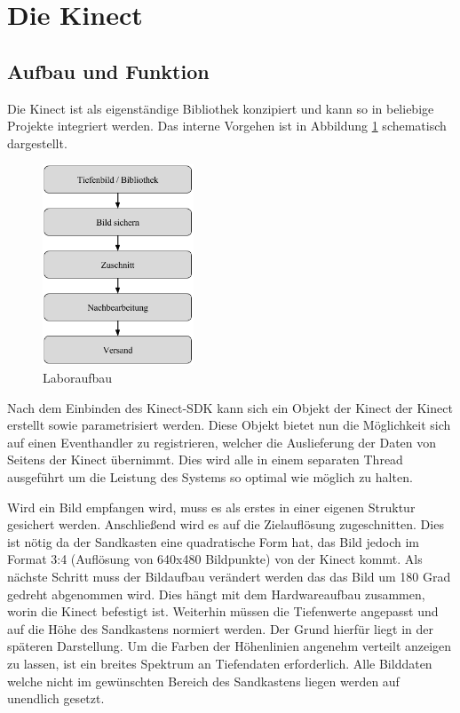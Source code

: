 \section{Die Kinect}
\begin{Spacing}{\mylinespace}

\subsection{Aufbau und Funktion}

Die Kinect ist als eigenständige Bibliothek konzipiert und kann so in beliebige Projekte integriert werden. Das interne Vorgehen ist in Abbildung \ref{fig:kinectdll} schematisch dargestellt. 

\begin{figure}[hbtp]
	\vspace{15px}
	\centering
	\includegraphics[width=0.4\textwidth]{graphics/block_dll.png}
	\caption{Laboraufbau}
	\label{fig:kinectdll}
\end{figure}

Nach dem Einbinden des Kinect-SDK kann sich ein Objekt der Kinect der Kinect erstellt sowie parametrisiert werden. Diese Objekt bietet nun die Möglichkeit sich auf einen Eventhandler zu registrieren, welcher die Auslieferung der Daten von Seitens der Kinect übernimmt. Dies wird alle in einem separaten Thread ausgeführt um die Leistung des Systems so optimal wie möglich zu halten.

Wird ein Bild empfangen wird, muss es als erstes in einer eigenen Struktur gesichert werden. Anschließend wird es auf die Zielauflösung zugeschnitten.
Dies ist nötig da der Sandkasten eine quadratische Form hat, das Bild jedoch im Format 3:4 (Auflösung von 640x480 Bildpunkte) von der Kinect kommt.
Als nächste Schritt muss der Bildaufbau verändert werden das das Bild um 180 Grad gedreht abgenommen wird. Dies hängt mit dem Hardwareaufbau zusammen, worin die Kinect befestigt ist. Weiterhin müssen die Tiefenwerte angepasst und auf die Höhe des Sandkastens normiert werden. Der Grund hierfür liegt in der späteren Darstellung. Um die Farben der Höhenlinien angenehm verteilt anzeigen zu lassen, ist ein breites Spektrum an Tiefendaten erforderlich. Alle Bilddaten welche nicht im gewünschten Bereich des Sandkastens liegen werden auf unendlich gesetzt.


\end{Spacing}

